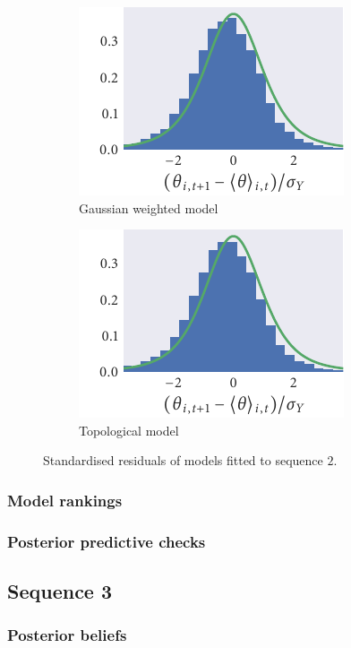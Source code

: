 \begin{figure}
\begin{subfigure}[b]{0.33333\textwidth}
  \end{subfigure}%
  \begin{subfigure}[b]{0.33333\textwidth}
    \includegraphics{seq2/gauss_residuals.pdf}
    \caption{Gaussian weighted model}
  \end{subfigure}%
  \begin{subfigure}[b]{0.33333\textwidth}
    \includegraphics{seq2/top_residuals.pdf}
    \caption{Topological model}
  \end{subfigure}
  \caption{Standardised residuals of models fitted to sequence $2$.}
\end{figure}

\subsubsection{Model rankings}

\subsubsection{Posterior predictive checks}

\subsection{Sequence 3}

\subsubsection{Posterior beliefs}

